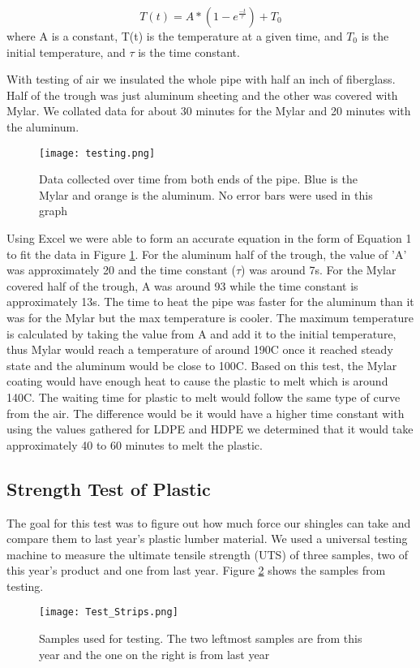 \documentclass[11pt,english]{article}
\begin{document}
\begin{equation}\label{second}
T(t)=A*(1-e^{\frac{-t}{\tau}})+T_0
\end{equation}
where A is a constant, T(t) is the temperature at a given time, and $T_0$ is the initial temperature, and $\tau$ is the time constant.

With testing of air we insulated the whole pipe with half an inch of fiberglass. Half of the trough was just aluminum sheeting and the other was covered with Mylar\textsuperscript{\textregistered}. We collated data for about 30 minutes for the Mylar\textsuperscript{\textregistered} and 20 minutes with the aluminum.
\begin{figure}[h!]
\centering
\texttt{[image: testing.png]}
\caption{Data collected over time from both ends of the pipe. Blue is the Mylar\textsuperscript{\textregistered} and orange is the aluminum. No error bars were used in this graph}
\label{fig:Data from Pipe}
\end{figure}

 Using Excel we were able to form an accurate equation in the form of Equation 1 to fit the data in Figure \ref{fig:Data from Pipe}. For the aluminum half of the trough, the value of 'A' was approximately 20 and the time constant ($\tau$) was around 7s. For the Mylar\textsuperscript{\textregistered} covered half of the trough, A was around 93 while the time constant is approximately 13s. The time to heat the pipe was faster for the aluminum than it was for the Mylar\textsuperscript{\textregistered} but the max temperature is cooler. The maximum temperature is calculated by taking the value from A and add it to the initial temperature, thus Mylar\textsuperscript{\textregistered} would reach a temperature of around 190\degree C once it reached steady state and the aluminum would be close to 100\degree C. Based on this test, the Mylar\textsuperscript{\textregistered} coating would have enough heat to cause the plastic to melt which is around 140\degree C. The waiting time for plastic to melt would follow the same type of curve from the air. The difference would be it would have a higher time constant with using the values gathered for LDPE and HDPE we determined that it would take approximately 40 to 60 minutes to melt the plastic.

\subsection{Strength Test of Plastic}
The goal for this test was to figure out how much force our shingles can take and compare them to last year’s plastic lumber material.  We used a universal testing machine to measure the ultimate tensile strength (UTS) of three samples, two of this year’s product and one from last year.  Figure \ref{fig:Strength Test Samples} shows the samples from testing.  
\begin{figure}[h!]
\centering
\texttt{[image: Test\_Strips.png]}
\caption{ Samples used for testing. The two leftmost samples are from this year and the one on the right is from last year}
\label{fig:Strength Test Samples}
\end{figure}
\end{document}
